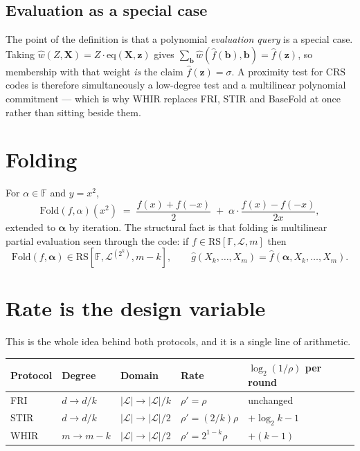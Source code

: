 \documentclass[11pt,a4paper]{article}
\newcommand{\eqp}{\mathrm{eq}}
\newcommand{\Fold}{\mathrm{Fold}}
\newcommand{\RS}{\mathrm{RS}}
\newcommand{\CRS}{\mathrm{CRS}}
\begin{document}
\subsection*{Evaluation as a special case}

The point of the definition is that a polynomial \emph{evaluation query} is a special case. Taking
$\hat w(Z,\boldsymbol X)=Z\cdot\eqp(\boldsymbol X,\boldsymbol z)$ gives
$\sum_{\boldsymbol b}\hat w(\hat f(\boldsymbol b),\boldsymbol b)=\hat f(\boldsymbol z)$, so
membership with that weight \emph{is} the claim $\hat f(\boldsymbol z)=\sigma$. A proximity test for
$\CRS$ codes is therefore simultaneously a low-degree test and a multilinear polynomial commitment
--- which is why WHIR replaces FRI, STIR and BaseFold at once rather than sitting beside them.

\section{Folding}

For $\alpha\in\mathbb{F}$ and $y=x^{2}$,
\[
  \Fold(f,\alpha)(x^{2}) \;=\; \frac{f(x)+f(-x)}{2}
  \;+\; \alpha\cdot\frac{f(x)-f(-x)}{2x},
\]
extended to $\boldsymbol\alpha$ by iteration. The structural fact is that folding is multilinear
partial evaluation seen through the code: if $f\in\RS[\mathbb{F},\mathcal{L},m]$ then
\[
  \Fold(f,\boldsymbol\alpha)\in\RS[\mathbb{F},\mathcal{L}^{(2^{k})},m-k],
  \qquad
  \hat g(X_{k},\dots,X_{m})=\hat f(\boldsymbol\alpha,X_{k},\dots,X_{m}).
  \tag{Claim 4.15}
\]

\section{Rate is the design variable}

This is the whole idea behind both protocols, and it is a single line of arithmetic.

\begin{center}\small
\begin{tabular}{@{}lllll@{}}
\toprule
\textbf{Protocol} & \textbf{Degree} & \textbf{Domain} & \textbf{Rate} & $\log_{2}(1/\rho)$ per round\\
\midrule
FRI  & $d\to d/k$ & $|\mathcal{L}|\to|\mathcal{L}|/k$ & $\rho'=\rho$ & unchanged\\
STIR & $d\to d/k$ & $|\mathcal{L}|\to|\mathcal{L}|/2$ & $\rho'=(2/k)\rho$ & $+\log_{2}k-1$\\
WHIR & $m\to m-k$ & $|\mathcal{L}|\to|\mathcal{L}|/2$ & $\rho'=2^{1-k}\rho$ & $+(k-1)$\\
\bottomrule
\end{tabular}
\end{center}
\end{document}
